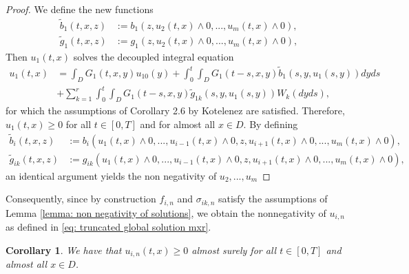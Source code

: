 \documentclass[12pt]{article}
\newtheorem{corollary}{Corollary}[section]
\theoremstyle{definition}
\theoremstyle{remark}
\begin{document}
\begin{proof}
    We define the new  functions 
    \begin{align*}
    \tilde{b}_1(t,x,z) &:= b_1(z,u_2(t,x)\wedge 0,...,u_m(t,x)\wedge 0),\\
    \tilde{g}_1(t,x,z) &:= g_1(z,u_2(t,x)\wedge 0,...,u_m(t,x)\wedge 0),
    \end{align*}
     Then $u_1(t,x)$ solves the decoupled integral equation
    \begin{align*}
        u_1(t,x) &= \int_D G_1(t,x,y)u_{10}(y)+\int_0^t\int_D G_1(t-s,x,y)\tilde{b}_1(s,y,u_1(s,y))dyds\\
    &+ \sum_{k=1}^r \int_0^t\int_D G_1(t-s,x,y)\tilde{g}_{1k}(s,y,u_1(s,y))W_k(dyds),
        \end{align*}
 for which the assumptions of Corollary 2.6 by Kotelenez \cite{kotelenez1992comparison} are satisfied. Therefore, $u_1(t,x)\geq 0$ for all $t\in [0,T]$ and for almost all $x\in D$. By defining
 \begin{align*}
     \tilde{b}_i(t,x,z) &:= b_i(u_1(t,x)\wedge 0,...,u_{i-1}(t,x)\wedge 0,z,u_{i+1} (t,x)\wedge 0,...,u_m(t,x)\wedge 0),\\
     \tilde{g}_{ik}(t,x,z) &:= g_{ik}(u_1(t,x)\wedge 0,...,u_{i-1}(t,x)\wedge 0,z,u_{i+1}(t,x)\wedge 0,...,u_m(t,x)\wedge 0),
 \end{align*}
 an identical argument yields the non negativity of $u_2,...,u_m$ 
\end{proof}
Consequently, since by construction $f_{i,n}$ and $\sigma_{ik,n}$ satisfy the assumptions of Lemma \ref{lemma: non negativity of solutions}, we obtain the nonnegativity of $u_{i,n}$ as defined in \eqref{eq: truncated global solution mxr}.
\begin{corollary}\label{corollary: nonnegativity of u_i,n}
    We have that $u_{i,n}(t,x)\geq 0$ almost surely for all $t\in [0,T]$ and almost all $x\in D$.
\end{corollary}
\end{document}
